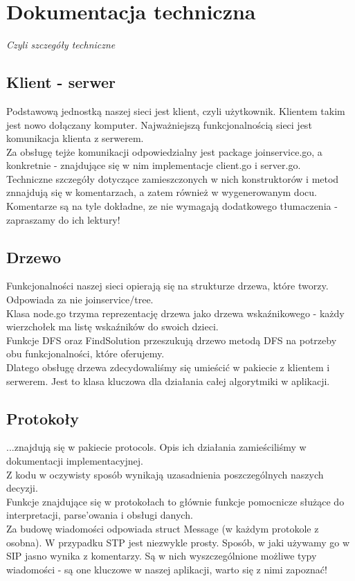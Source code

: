\section{Dokumentacja techniczna}

\begin{center}
\textit{Czyli szczegóły techniczne}
\end{center}

\subsection{Klient - serwer}
Podstawową jednostką naszej sieci jest klient, czyli użytkownik. Klientem takim jest nowo dołączany komputer. Najważniejszą funkcjonalnością sieci jest komunikacja klienta z serwerem.\\
Za obsługę tejże komunikacji odpowiedzialny jest package joinservice.go, a konkretnie - znajdujące się w nim implementacje client.go i server.go.\\
Techniczne szczegóły dotyczące zamieszczonych w nich konstruktorów i metod znnajdują się w komentarzach, a zatem również w wygenerowanym docu. Komentarze są na tyle dokładne, ze nie wymagają dodatkowego tłumaczenia - zapraszamy do ich lektury!

\subsection{Drzewo}
Funkcjonalności naszej sieci opierają się na strukturze drzewa, które tworzy. Odpowiada za nie joinservice/tree.\\
Klasa node.go trzyma reprezentację drzewa jako drzewa wskaźnikowego - każdy wierzchołek ma listę wskaźników do swoich dzieci.\\
Funkcje DFS oraz FindSolution przeszukują drzewo metodą DFS na potrzeby obu funkcjonalności, które oferujemy.\\
Dlatego obsługę drzewa zdecydowaliśmy się umieścić w pakiecie z klientem i serwerem. Jest to klasa kluczowa dla działania całej algorytmiki w aplikacji.

\subsection{Protokoły}
...znajdują się w pakiecie protocols. Opis ich działania zamieściliśmy w dokumentacji implementacyjnej.\\
Z kodu w oczywisty sposób wynikają uzasadnienia poszczególnych naszych decyzji.\\
Funkcje znajdujące się w protokołach to głównie funkcje pomocnicze służące do interpretacji, parse'owania i obsługi danych.\\
Za budowę wiadomości odpowiada struct Message (w każdym protokole z osobna). W przypadku STP jest niezwykle prosty. Sposób, w jaki używamy go w SIP jasno wynika z komentarzy. Są w nich wyszczególnione możliwe typy wiadomości - są one kluczowe w naszej aplikacji, warto się z nimi zapoznać!

